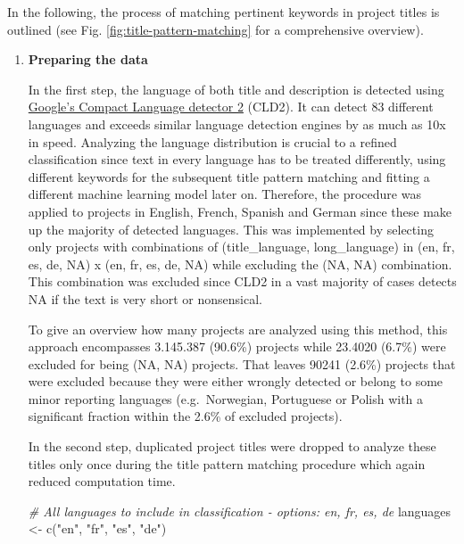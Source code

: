 \documentclass[
]{article}
\newenvironment{Shaded}{\begin{snugshade}}{\end{snugshade}}
\newcommand{\CommentTok}[1]{\textcolor[rgb]{0.56,0.35,0.01}{\textit{#1}}}
\newcommand{\FunctionTok}[1]{\textcolor[rgb]{0.00,0.00,0.00}{#1}}
\newcommand{\NormalTok}[1]{#1}
\newcommand{\OtherTok}[1]{\textcolor[rgb]{0.56,0.35,0.01}{#1}}
\newcommand{\StringTok}[1]{\textcolor[rgb]{0.31,0.60,0.02}{#1}}
\begin{document}
In the following, the process of matching pertinent keywords in project titles is outlined (see Fig. \ref{fig:title-pattern-matching} for a comprehensive overview).

\begin{enumerate}
\def\labelenumi{\arabic{enumi}.}
\item
  \textbf{Preparing the data}

  In the first step, the language of both title and description is detected using \href{https://github.com/CLD2Owners/cld2}{Google's Compact Language detector 2} (CLD2). It can detect 83 different languages and exceeds similar language detection engines by as much as 10x in speed. Analyzing the language distribution is crucial to a refined classification since text in every language has to be treated differently, using different keywords for the subsequent title pattern matching and fitting a different machine learning model later on. Therefore, the procedure was applied to projects in English, French, Spanish and German since these make up the majority of detected languages. This was implemented by selecting only projects with combinations of (title\_language, long\_language) in (en, fr, es, de, NA) x (en, fr, es, de, NA) while excluding the (NA, NA) combination. This combination was excluded since CLD2 in a vast majority of cases detects NA if the text is very short or nonsensical.

  To give an overview how many projects are analyzed using this method, this approach encompasses 3.145.387 (90.6\%) projects while 23.4020 (6.7\%) were excluded for being (NA, NA) projects. That leaves 90241 (2.6\%) projects that were excluded because they were either wrongly detected or belong to some minor reporting languages (e.g.~Norwegian, Portuguese or Polish with a significant fraction within the 2.6\% of excluded projects).

  In the second step, duplicated project titles were dropped to analyze these titles only once during the title pattern matching procedure which again reduced computation time.

\begin{Shaded}
\begin{Highlighting}[]
\CommentTok{\# All languages to include in classification {-} options: en, fr, es, de}
\NormalTok{languages }\OtherTok{\textless{}{-}} \FunctionTok{c}\NormalTok{(}\StringTok{"en"}\NormalTok{, }\StringTok{"fr"}\NormalTok{, }\StringTok{"es"}\NormalTok{, }\StringTok{"de"}\NormalTok{)}


\end{Highlighting}
\end{Shaded}
\end{enumerate}
\end{document}
